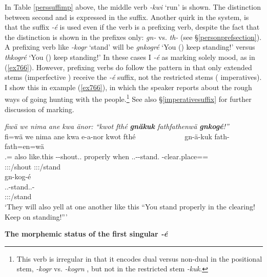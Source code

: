 In Table \ref{perssuffimp} above, the middle verb \emph{-kwi} `run' is shown. The distinction between second  and  is expressed in the suffix. Another quirk in the system, is that the suffix \emph{-é} is used even if the verb is a prefixing verb, despite the fact that the  distinction is shown in the prefixes only: \emph{gn-} \Ssg{} vs. \emph{th-} \Snsg{} (see \S\ref{personprefsection}). A prefixing verb like \emph{-kogr} `stand' will be \emph{gnkogré} `You (\Sg) keep standing!' versus \emph{thkogré} `You (\Pl) keep standing!' In these cases I  \emph{-é} as marking solely  mood, as in (\ref{ex766}). However, prefixing verbs do follow the pattern in that only extended stems (imperfective ) receive the \emph{-é} suffix, not the restricted stems ( imperatives). I show this in example (\ref{ex766}), in which the speaker reports about the rough ways of going hunting with the  people.\footnote{This verb is irregular in that it encodes dual versus non-dual in the positional stem, \emph{-kogr} \Ndu{} vs. \emph{-kogrn} \Du{}, but not in the restricted stem \emph{-kuk}.} See also \S\ref{imperativesuffix} for further discussion of  marking.

\begin{exe}
	\ex \emph{fiwä we nima ane kwa änor: ``kwot fthé \textbf{gnäkuk} fathfathenwä \textbf{gnkogé}!''}\\
	\glll fi=wä we nima ane kwa e-a-nor kwot fthé~~~~~~~~~~~~~ gn-ä-kuk fath-fath=en=wä\\
	\Third.\Abs{}=\Emph{} also like.this \Dem{} \Fut{} \Stnsg-\Vc-shout.\Ext.\Ndu{} properly when \Ssg.\Bet.\Imp-\Ndu-stand.\Rs{} \Redup-clear.place=\Loc=\Emph{}\\
	{} {} {} {} {} {\footnotesize \Tpl:\Sbj:\Nonpast:\Ipfv/shout} {} {} {\footnotesize \Ssg:\Sbj:\Imp:\Pfv/stand} {}\\
	\sn
	\glll gn-kog-é\\
	\Ssg.\Bet.\Imp-stand.\Ext.\Ndu-\Imp{}\\
	{\footnotesize \Ssg:\Sbj:\Imp:\Ipfv/stand}\\
	\trans `They will also yell at one another like this ``You stand properly in the clearing! Keep on standing!''' 
	\label{ex766}
\end{exe}

\noindent
\textbf{The morphemic status of the first singular \emph{-é}}%

